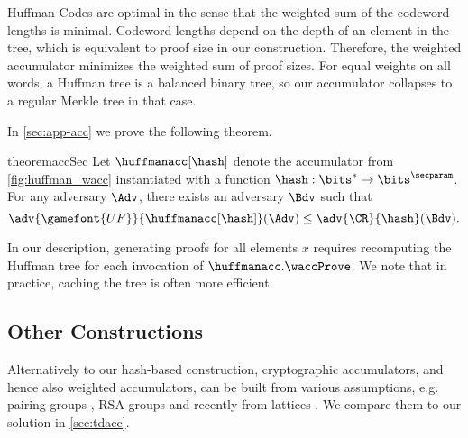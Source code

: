 Huffman Codes are optimal in the sense that the weighted sum of the codeword lengths is minimal. Codeword lengths depend
on the depth of an element in the tree, which is equivalent to proof size in our construction. Therefore, the weighted
accumulator minimizes the weighted sum of proof sizes. For equal weights on all words, a Huffman tree is a balanced
binary tree, so our accumulator collapses to a regular Merkle tree in that case.

In \cref{sec:app-acc} we prove the following theorem.
\begin{restatable}{theorem}{accSec}\label{thm:wacc_sec}
  Let $\huffmanacc[\hash]$ denote the accumulator from \cref{fig:huffman_wacc} instantiated with a function $\hash:\bits^*\rightarrow \bits^\secparam$.
  For any adversary $\Adv$, there exists an adversary $\Bdv$ such that
  \begin{equation*}
    \adv{\gamefont{UF}}{\huffmanacc[\hash]}({\Adv}) \leq \adv{\CR}{\hash}({\Bdv}).
  \end{equation*}
\end{restatable}


\begin{remark}
In our description, generating proofs for all elements $x$ requires recomputing the Huffman tree for each invocation of $\huffmanacc.\waccProve$. We note that in practice, caching the tree is often more efficient.
\end{remark}


\subsection{Other Constructions}
Alternatively to our hash-based construction, cryptographic accumulators, and hence also weighted accumulators, can be
built from various assumptions, e.g. pairing groups \cite{RSA:ATSM09, RSA:LNguyen05, EPRINT:DamTri08}, RSA groups
\cite{EC:BenDeM93, EC:BarPfi97, ICICS:Sander99, C:CamLys02} and recently from lattices \cite{EC:LLNW16,
  ACISP:YAYLX18}. We compare them to our solution in \cref{sec:tdacc}.





